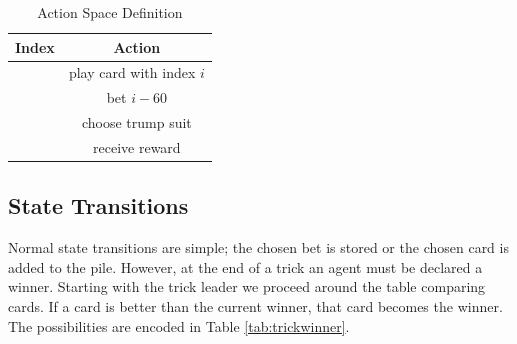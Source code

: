 \documentclass[10pt]{article} %
\begin{document}
\begin{table}[h!]
\centering
\begin{tabular}{|c|c|} \hline
Index & Action \\ \hline
[0, 59] & play card with index $i$ \\ \hline
[60, 80] & bet $i-60$ \\ \hline
[81, 84] & choose trump suit \\ \hline
[85] & receive reward \\ \hline
\end{tabular}
\caption{Action Space Definition} \label{tab:actions}
\end{table}

\subsection{State Transitions}

Normal state transitions are simple; the chosen bet is stored or the chosen card is added to the pile. However, at the end of a trick an agent must be declared a winner. Starting with the trick leader we proceed around the table comparing cards. If a card is better than the current winner, that card becomes the winner. The possibilities are encoded in Table \ref{tab:trickwinner}.
\end{document}
